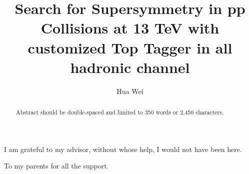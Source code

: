 \documentclass[oneside,final,letterpaper]{ucr}
\begin{document}

\title{Search for Supersymmetry in pp Collisions at 13 TeV with customized Top Tagger in all hadronic channel}
\author{Hua Wei}

\maketitle
\copyrightpage{}
\approvalpage{}

\begin{frontmatter}

\begin{acknowledgements}
I am grateful to my advisor, without whose help, I would not have been here.
\end{acknowledgements}
\begin{dedication}
\null\vfil
{\large
\begin{center}
To my parents for all the support.
\end{center}
}
\vfil\null
\end{dedication}
\begin{abstract}
Abstract should be double-spaced and limited to 350 words or 2,450 characters.
\end{abstract}
\tableofcontents
\listoffigures
\listoftables
\end{frontmatter}







\nocite{*}
% 




\end{document}
